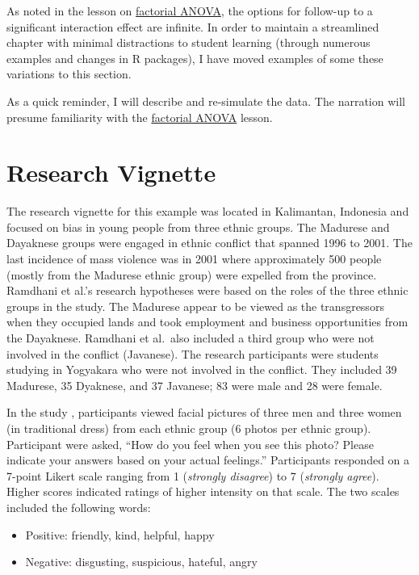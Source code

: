 \documentclass[
  11pt,
]{book}
\providecommand{\tightlist}{%
  \setlength{\itemsep}{0pt}\setlength{\parskip}{0pt}}
\begin{document}
As noted in the lesson on \protect\hyperlink{between}{factorial ANOVA}, the options for follow-up to a significant interaction effect are infinite. In order to maintain a streamlined chapter with minimal distractions to student learning (through numerous examples and changes in R packages), I have moved examples of some these variations to this section.

As a quick reminder, I will describe and re-simulate the data. The narration will presume familiarity with the \protect\hyperlink{between}{factorial ANOVA} lesson.

\hypertarget{research-vignette-9}{%
\section*{Research Vignette}\label{research-vignette-9}}


The research vignette for this example was located in Kalimantan, Indonesia and focused on bias in young people from three ethnic groups. The Madurese and Dayaknese groups were engaged in ethnic conflict that spanned 1996 to 2001. The last incidence of mass violence was in 2001 where approximately 500 people (mostly from the Madurese ethnic group) were expelled from the province. Ramdhani et al.'s \citeyearpar{ramdhani_affective_2018} research hypotheses were based on the roles of the three ethnic groups in the study. The Madurese appear to be viewed as the transgressors when they occupied lands and took employment and business opportunities from the Dayaknese. Ramdhani et al.~also included a third group who were not involved in the conflict (Javanese). The research participants were students studying in Yogyakara who were not involved in the conflict. They included 39 Madurese, 35 Dyaknese, and 37 Javanese; 83 were male and 28 were female.

In the study \citep{ramdhani_affective_2018}, participants viewed facial pictures of three men and three women (in traditional dress) from each ethnic group (6 photos per ethnic group). Participant were asked, ``How do you feel when you see this photo? Please indicate your answers based on your actual feelings.'' Participants responded on a 7-point Likert scale ranging from 1 (\emph{strongly disagree}) to 7 (\emph{strongly agree}). Higher scores indicated ratings of higher intensity on that scale. The two scales included the following words:

\begin{itemize}
\tightlist
\item
  Positive: friendly, kind, helpful, happy
\item
  Negative: disgusting, suspicious, hateful, angry
\end{itemize}
\end{document}
